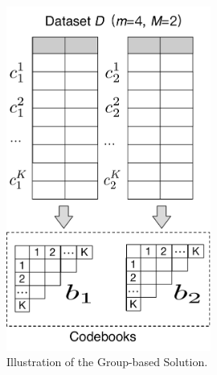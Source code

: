 \begin{figure}[t]
    \centering
    \includegraphics[width=0.6\textwidth]{figs/codebook}
    \caption{Illustration of the Group-based Solution.}
    \label{fig:codebook}
\end{figure}